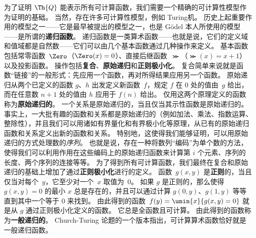 为了证明 $\Th{Q}$ 能表示所有可计算函数，我们需要一个精确的可计算性模型作为证明的基础。
当然，存在许多可计算性模型，例如 Turing机。
历史上起重要作用的模型之一——它是最早被提出的模型之一，也是 Gödel 本人所使用的模型——是所谓的\textbf{递归函数}。
递归函数是一类算术函数——也就是说，它们的定义域和值域都是自然数——它们可以由几个基本函数通过几种操作来定义。
基本函数包括常零函数~$\Zero$（$\Zero(x) = 0$）、直接后继函数~$\Succ$（$\Succ(x) = x+1$）以及投影函数。
操作包括\textbf{复合}、\textbf{原始递归}和\textbf{正则极小化}。
复合简单来说就是函数“链接”的一般形式：先应用一个函数，再对所得结果应用另一个函数。
原始递归从两个已定义的函数 $g$、$h$ 出发定义新函数~$f$，规定 $f$ 在 $0$ 处的值由~$g$ 给出，而在任意数 $n+1$ 处的值由 $h$ 应用于 $f(n)$ 给出。
仅用这两个原理定义的函数称为\textbf{原始递归的}。
一个关系是原始递归的，当且仅当其示性函数是原始递归的。
事实上，一大批有趣的函数和关系都是原始递归的（例如加法、乘法、指数运算、整除性），并且我们可以用诸如有界量化和有界极小化等原理，从已有的原始递归函数和关系定义出新的函数和关系。
特别地，这使得我们能够证明，可以用原始递归的方式处理数的\emph{序列}。
也就是说，存在一种将数列“编码”为单个数的方法，使得我们可以利用作用在这些编码上的原始递归函数来计算第 $i$ 个元素、序列的长度、两个序列的连接等等。
为了得到所有可计算函数，我们最终在复合和原始递归的基础上增加了通过\textbf{正则极小化}进行的定义。
函数~$g(x, y)$ 是\textbf{正则}的，当且仅当对每个~$y$，它至少对一个~$x$ 取值为~$0$。
如果 $g$ 是正则的，那么使得 $g(x, y) = 0$ 的最小 $x$ 总是存在的，并且可以通过计算 $g(0, y)$、$g(1, y)$ 等等直到其中一个等于 $0$ 来找到。
由此得到的函数~$f(y) = \umin{x}{g(x, y) = 0}$ 就是从 $g$ 通过正则极小化定义的函数。
它总是全函数且可计算。
由此得到的函数称为\textbf{一般递归的}。
Church-Turing 论题的一个版本指出，可计算算术函数恰好就是一般递归函数。
